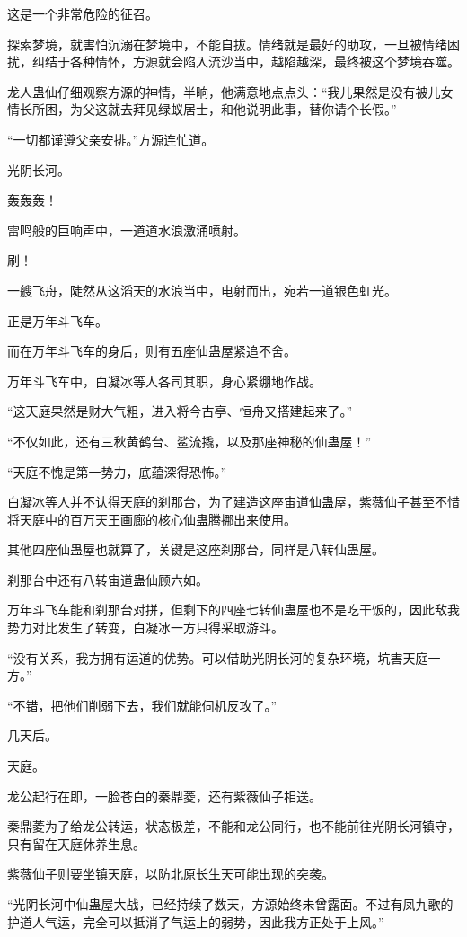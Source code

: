 \begin{this_body}
这是一个非常危险的征召。

探索梦境，就害怕沉溺在梦境中，不能自拔。情绪就是最好的助攻，一旦被情绪困扰，纠结于各种情怀，方源就会陷入流沙当中，越陷越深，最终被这个梦境吞噬。

龙人蛊仙仔细观察方源的神情，半晌，他满意地点点头：“我儿果然是没有被儿女情长所困，为父这就去拜见绿蚁居士，和他说明此事，替你请个长假。”

“一切都谨遵父亲安排。”方源连忙道。

光阴长河。

轰轰轰！

雷鸣般的巨响声中，一道道水浪激涌喷射。

刷！

一艘飞舟，陡然从这滔天的水浪当中，电射而出，宛若一道银色虹光。

正是万年斗飞车。

而在万年斗飞车的身后，则有五座仙蛊屋紧追不舍。

万年斗飞车中，白凝冰等人各司其职，身心紧绷地作战。

“这天庭果然是财大气粗，进入将今古亭、恒舟又搭建起来了。”

“不仅如此，还有三秋黄鹤台、鲨流撬，以及那座神秘的仙蛊屋！”

“天庭不愧是第一势力，底蕴深得恐怖。”

白凝冰等人并不认得天庭的刹那台，为了建造这座宙道仙蛊屋，紫薇仙子甚至不惜将天庭中的百万天王画廊的核心仙蛊腾挪出来使用。

其他四座仙蛊屋也就算了，关键是这座刹那台，同样是八转仙蛊屋。

刹那台中还有八转宙道蛊仙顾六如。

万年斗飞车能和刹那台对拼，但剩下的四座七转仙蛊屋也不是吃干饭的，因此敌我势力对比发生了转变，白凝冰一方只得采取游斗。

“没有关系，我方拥有运道的优势。可以借助光阴长河的复杂环境，坑害天庭一方。”

“不错，把他们削弱下去，我们就能伺机反攻了。”

几天后。

天庭。

龙公起行在即，一脸苍白的秦鼎菱，还有紫薇仙子相送。

秦鼎菱为了给龙公转运，状态极差，不能和龙公同行，也不能前往光阴长河镇守，只有留在天庭休养生息。

紫薇仙子则要坐镇天庭，以防北原长生天可能出现的突袭。

“光阴长河中仙蛊屋大战，已经持续了数天，方源始终未曾露面。不过有凤九歌的护道人气运，完全可以抵消了气运上的弱势，因此我方正处于上风。”


\end{this_body}
